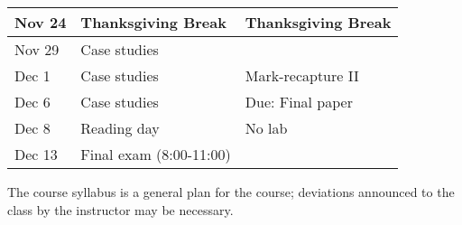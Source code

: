 \documentclass[12pt]{article}
\begin{document}
\begin{center}
\begin{tabular}[c]{lll}
Nov 24     & Thanksgiving Break                 & Thanksgiving Break                   \\
\hline
Nov 29     & Case studies                       &                                      \\
Dec 1      & Case studies                       & Mark-recapture II                    \\
\hline
Dec 6      & Case studies                       & Due: Final paper                     \\
Dec 8      & Reading day                        & No lab                               \\
\hline
Dec 13     & Final exam (8:00-11:00)            &                                      \\
\hline \hline
\end{tabular}
\end{center}

The course syllabus is a general plan for the course; deviations announced to the class by the instructor may be necessary.


\end{document}
